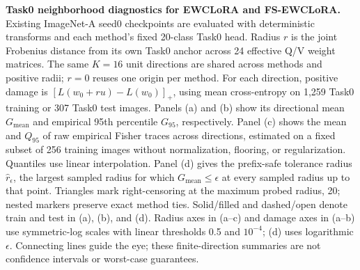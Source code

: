 \caption{\textbf{Task0 neighborhood diagnostics for EWCLoRA and FS-EWCLoRA.} Existing ImageNet-A seed0 checkpoints are evaluated with deterministic transforms and each method's fixed 20-class Task0 head. Radius $r$ is the joint Frobenius distance from its own Task0 anchor across 24 effective Q/V weight matrices. The same $K=16$ unit directions are shared across methods and positive radii; $r=0$ reuses one origin per method. For each direction, positive damage is $[L(w_0+ru)-L(w_0)]_+$, using mean cross-entropy on 1,259 Task0 training or 307 Task0 test images. Panels (a) and (b) show its directional mean $G_{\mathrm{mean}}$ and empirical 95th percentile $G_{95}$, respectively. Panel (c) shows the mean and $Q_{95}$ of raw empirical Fisher traces across directions, estimated on a fixed subset of 256 training images without normalization, flooring, or regularization. Quantiles use linear interpolation. Panel (d) gives the prefix-safe tolerance radius $\hat r_\epsilon$, the largest sampled radius for which $G_{\mathrm{mean}}\leq\epsilon$ at every sampled radius up to that point. Triangles mark right-censoring at the maximum probed radius, 20; nested markers preserve exact method ties. Solid/filled and dashed/open denote train and test in (a), (b), and (d). Radius axes in (a--c) and damage axes in (a--b) use symmetric-log scales with linear thresholds 0.5 and $10^{-4}$; (d) uses logarithmic $\epsilon$. Connecting lines guide the eye; these finite-direction summaries are not confidence intervals or worst-case guarantees.}
\label{fig:B-neighborhood-merged}
